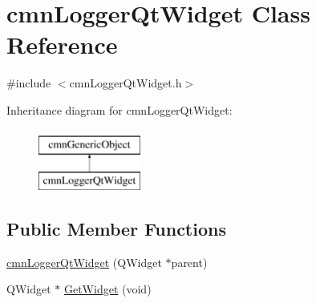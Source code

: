 \hypertarget{classcmn_logger_qt_widget}{\section{cmn\-Logger\-Qt\-Widget Class Reference}
\label{classcmn_logger_qt_widget}
}


{\ttfamily \#include $<$cmn\-Logger\-Qt\-Widget.\-h$>$}

Inheritance diagram for cmn\-Logger\-Qt\-Widget\-:\begin{figure}[H]
\begin{center}
\leavevmode
\includegraphics[height=2.000000cm]{dd/de1/classcmn_logger_qt_widget}
\end{center}
\end{figure}
\subsection*{Public Member Functions}
\begin{DoxyCompactItemize}
\item 
\hyperlink{classcmn_logger_qt_widget_a9fff93827e24bb98b8de352f98f330dc}{cmn\-Logger\-Qt\-Widget} (Q\-Widget $\ast$parent)
\item 
Q\-Widget $\ast$ \hyperlink{classcmn_logger_qt_widget_a5ca75a6b622392e42b2cfc7244e4e816}{Get\-Widget} (void)
\end{DoxyCompactItemize}

